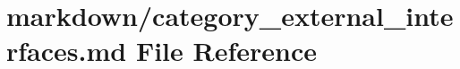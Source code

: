 \hypertarget{category__external__interfaces_8md}{}\section{markdown/category\+\_\+external\+\_\+interfaces.md File Reference}
\label{category__external__interfaces_8md}
